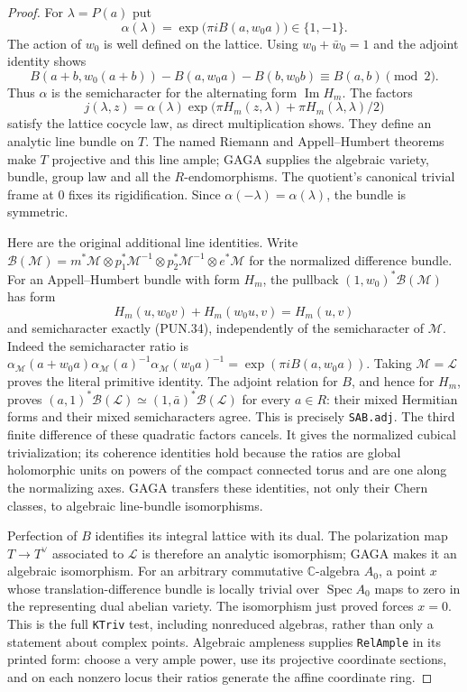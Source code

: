 \documentclass[11pt,a4paper]{article}
\numberwithin{equation}{section}
\theoremstyle{remark}\newtheorem{remark}[theorem]{Remark}
\begin{document}
\begin{proof}
For \(\lambda=P(a)\) put
\[
       \alpha(\lambda)=\exp\bigl(\pi i B(a,w_0a)\bigr)\in\{1,-1\}.
 \tag{PUN.34}
\]
The action of \(w_0\) is well defined on the lattice.  Using
\(w_0+\bar w_0=1\) and the adjoint identity shows
\[
 B(a+b,w_0(a+b))-B(a,w_0a)-B(b,w_0b)
                                  \equiv B(a,b)\pmod2.
\]
Thus \(\alpha\) is the semicharacter for the alternating
form \(\operatorname{Im}H_m\).  The factors
\[
 j(\lambda,z)=\alpha(\lambda)
       \exp\bigl(\pi H_m(z,\lambda)+\pi H_m(\lambda,\lambda)/2\bigr)
 \tag{PUN.35}
\]
satisfy the lattice cocycle law, as direct multiplication
shows.  They define an analytic line bundle on \(T\).
The named Riemann and Appell--Humbert theorems make \(T\)
projective and this line ample; GAGA supplies the algebraic
variety, bundle, group law and all the \(R\)-endomorphisms.
The quotient's canonical trivial frame at \(0\) fixes its
rigidification.  Since \(\alpha(-\lambda)=\alpha(\lambda)\),
the bundle is symmetric.

Here are the original additional line identities.  Write
\(\mathcal B(\mathcal M)=m^*\mathcal M\otimes
p_1^*\mathcal M^{-1}\otimes p_2^*\mathcal M^{-1}\otimes
e^*\mathcal M\) for the normalized difference bundle.
For an Appell--Humbert bundle with form \(H_m\), the pullback
\((1,w_0)^*\mathcal B(\mathcal M)\) has form
\[
 H_m(u,w_0v)+H_m(w_0u,v)=H_m(u,v)
\]
and semicharacter exactly (PUN.34), independently of the
semicharacter of \(\mathcal M\).  Indeed the semicharacter
ratio is
\(\alpha_{\mathcal M}(a+w_0a)\alpha_{\mathcal M}(a)^{-1}
\alpha_{\mathcal M}(w_0a)^{-1}=\exp(\pi iB(a,w_0a))\).
Taking \(\mathcal M=\mathcal L\) proves the literal primitive
identity.  The adjoint relation for \(B\), and hence for
\(H_m\), proves
\((a,1)^*\mathcal B(\mathcal L)
\simeq(1,\bar a)^*\mathcal B(\mathcal L)\) for every
\(a\in R\): their mixed Hermitian forms and their mixed
semicharacters agree.  This is precisely \texttt{SAB.\allowbreak adj}.
The third finite difference of these quadratic factors cancels.
It gives the normalized cubical trivialization; its coherence
identities hold because the ratios are global holomorphic units
on powers of the compact connected torus and are one along the
normalizing axes.  GAGA transfers these identities, not only
their Chern classes, to algebraic line-bundle isomorphisms.

Perfection of \(B\) identifies its integral lattice with its
dual.  The polarization map \(T\to T^\vee\) associated to
\(\mathcal L\) is therefore an analytic isomorphism; GAGA
makes it an algebraic isomorphism.  For an arbitrary commutative
\(\mathbb C\)-algebra \(A_0\), a point \(x\) whose
translation-difference bundle is locally trivial over
\(\operatorname{Spec}A_0\) maps to zero in the representing
dual abelian variety.  The isomorphism just proved forces
\(x=0\).  This is the full \texttt{KTriv} test, including
nonreduced algebras, rather than only a statement about complex
points.  Algebraic ampleness supplies \texttt{Rel\allowbreak Ample} in its
printed form: choose a very ample power, use its projective
coordinate sections, and on each nonzero locus their ratios
generate the affine coordinate ring.


\end{proof}
\end{document}
